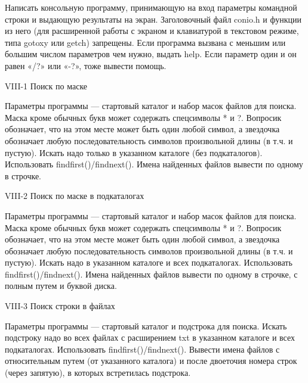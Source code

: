 
Написать консольную программу, принимающую на вход параметры командной строки
и выдающую результаты на экран. Заголовочный файл conio.h и функции из него
(для расширенной работы с экраном и клавиатурой в текстовом режиме, типа
gotoxy или getch) запрещены. Если программа вызвана с меньшим или большим
числом параметров чем нужно, выдать help. Если параметр один и он равен «/?»
или «-?», тоже вывести помощь.



VIII-1 Поиск по маске

Параметры программы — стартовый каталог и набор масок файлов для поиска. Маска
кроме обычных букв может содержать спецсимволы * и ?. Вопросик обозначает, что
на этом месте может быть один любой символ, а звездочка обозначает любую
последовательность символов произвольной длины (в т.ч. и пустую). Искать надо
только в указанном каталоге (без подкаталогов). Использовать
findfirst()/findnext(). Имена найденных файлов вывести по одному в строчке.



VIII-2 Поиск по маске в подкаталогах

Параметры программы — стартовый каталог и набор масок файлов для поиска. Маска
кроме обычных букв может содержать спецсимволы * и ?. Вопросик обозначает, что
на этом месте может быть один любой символ, а звездочка обозначает любую
последовательность символов произвольной длины (в т.ч. и пустую). Искать надо
в указанном каталоге и всех подкаталогах. Использовать findfirst()/findnext().
Имена найденных файлов вывести по одному в строчке, с полным путем и буквой
диска.



VIII-3 Поиск строки в файлах

Параметры программы — стартовый каталог и подстрока для поиска. Искать
подстроку надо во всех файлах с расширением txt в указанном каталоге и всех
подкаталогах. Использовать findfirst()/findnext(). Вывести имена файлов с
относительным путем (от указанного каталога) и после двоеточия номера строк
(через запятую), в которых встретилась подстрока.


